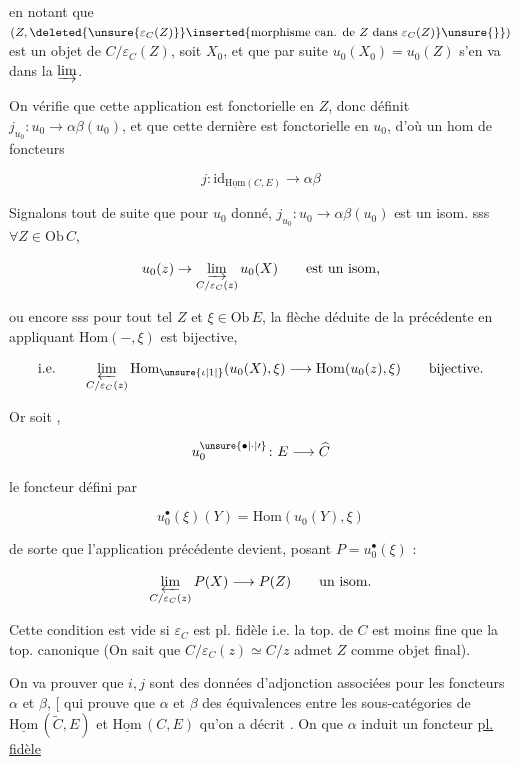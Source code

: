 en notant que $(Z,\deleted{\unsure{\varepsilon_C(Z)}}\inserted{\text{morphisme can. de } Z\text{ dans }\varepsilon_C(Z)}\unsure{\}})$ est un objet de $C/\varepsilon_C(Z)$, soit $X_0$, et que par suite $u_0(X_0)=u_0(Z)$ s'en va dans la $\varinjlim$.

On vérifie que cette application est fonctorielle en $Z$, donc définit $j_{u_0}\colon u_0\longrightarrow\alpha\beta(u_0)$, et que cette dernière est fonctorielle en $u_0$, d'où un hom de foncteurs

\[
\boxed{j\colon\mathrm{id}_{\underline{\mathrm{Hom}}(C,E)}\longrightarrow\alpha\beta}
\]

Signalons tout de suite que pour  $u_0$ donné, $j_{u_0}\colon u_0\longrightarrow\alpha\beta(u_0)$ est un isom. sss  $\forall Z\in\mathrm{Ob}\,C$,

\[
u_0(z)\to\varinjlim_{C/\varepsilon_C(z)}u_0(X)\qquad\text{est un isom,}
\]

ou encore sss pour tout tel $Z$ et $\xi\in\mathrm{Ob}\,E$, la flèche déduite de la précédente en appliquant $\mathrm{Hom}(-,\xi)$ est bijective,

\[
\text{i.e.}\qquad\varprojlim_{C/\varepsilon_C(z)}\mathrm{Hom}_{\unsure{\iota|1|{}}}(u_0(X),\xi)\longrightarrow\mathrm{Hom}(u_0(z),\xi)\qquad\text{bijective.}
\]

Or soit ,

\[
u_0^{\unsure{\bullet|\cdot|\prime}}\colon E\longrightarrow\widehat C
\]

le foncteur défini par

\[
u_0^\bullet(\xi)(Y)=\mathrm{Hom}(u_0(Y),\xi)
\]

de sorte que l'application précédente devient, posant $P=u_0^\bullet(\xi)$ :

\[
\varprojlim_{C/\varepsilon_C(z)}P(X)\longrightarrow P(Z)\qquad\text{un isom.}
\]

 Cette condition est vide si $\varepsilon_C$ est pl. fidèle i.e. la top. de $C$ est moins fine que la top. canonique (On sait que $C/\varepsilon_C(z)\simeq C/z$ admet $Z$ comme objet final).

On va prouver que $i,j$ sont des données d'adjonction associées pour les foncteurs $\alpha$ et $\beta$, [ qui prouve que $\alpha$ et $\beta$   des équivalences entre les sous-catégories  de $\underline{\mathrm{Hom}}\,(\widetilde C,E)$ et $\underline{\mathrm{Hom}}\,(C,E)$ qu'on a décrit . On    que $\alpha$ induit un foncteur \uline{pl. fidèle}

